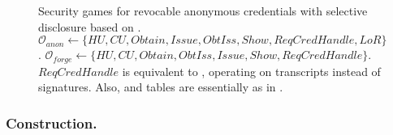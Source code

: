 \begin{figure}[ht!]
  \centering
  \caption{Security games for revocable anonymous credentials with selective
    disclosure based on \cite{fhs19}. 
    $\mathcal{O}_{anon} \gets \lbrace HU,CU,Obtain,Issue,ObtIss,Show,
    ReqCredHandle,LoR\rbrace$. $\mathcal{O}_{forge} \gets \lbrace HU,CU,
    Obtain,ObtIss,Issue,Show,ReqCredHandle \rbrace$. $ReqCredHandle$ is
    equivalent to \OPEN, operating on transcripts \utrans instead of signatures.
    Also, \OWNR and \ATTR tables are essentially as in .}
  \label{fig:model-rac}  
\end{figure}

\subsubsection{\CUASRAC Construction.} %

